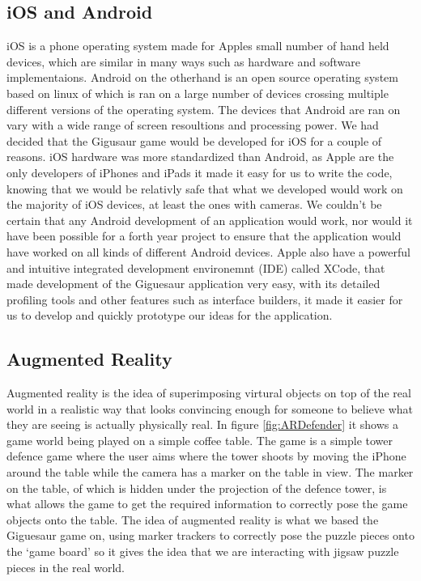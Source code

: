 \documentclass{article}
\begin{document}
\subsection{iOS and Android}
iOS is a phone operating system made for Apples small number of hand held
devices, which are similar in many ways such as hardware and software
implementaions. Android on the otherhand is an open source operating system
based on linux of which is ran on a large number of devices crossing multiple
different versions of the operating system. The devices that Android are ran on
vary with a wide range of screen resoultions and processing power. We had
decided that the Gigusaur game would be developed for iOS for a couple of
reasons. iOS hardware was more standardized than Android, as Apple are the only
developers of iPhones and iPads it made it easy for us to write the code,
knowing that we would be relativly safe that what we developed would work on the
majority of iOS devices, at least the ones with cameras. We couldn't be certain
that any Android development of an application would work, nor would it have
been possible for a forth year project to ensure that the application would have
worked on all kinds of different Android devices. Apple also have a powerful and
intuitive integrated development environemnt (IDE) called XCode, that made
development of the Giguesaur application very easy, with its detailed profiling
tools and other features such as interface builders, it made it easier for us to
develop and quickly prototype our ideas for the application.

\subsection{Augmented Reality}
Augmented reality is the idea of superimposing virtural objects on top of the
real world in a realistic way that looks convincing enough for someone to
believe what they are seeing is actually physically real. In figure
\ref{fig:ARDefender} it shows a game world being played on a simple coffee
table. The game is a simple tower defence game where the user aims where the
tower shoots by moving the iPhone around the table while the camera has a marker
on the table in view. The marker on the table, of which is hidden under the
projection of the defence tower, is what allows the game to get the required
information to correctly pose the game objects onto the table. The idea of
augmented reality is what we based the Giguesaur game on, using marker trackers
to correctly pose the puzzle pieces onto the `game board' so it gives the idea
that we are interacting with jigsaw puzzle pieces in the real world.
\end{document}
